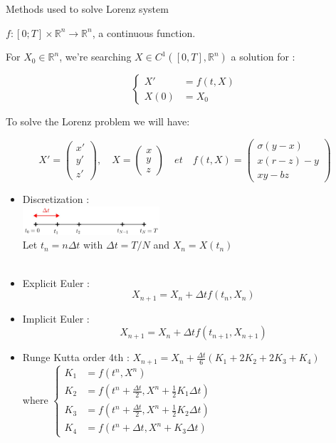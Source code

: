 \documentclass[10pt,xcolor={table,dvipsnames},t]{beamer}
\begin{document}
	\begin{frame}[allowframebreaks]{Methods used to solve Lorenz system}
		
		$f : [0; T] \times \mathbb{R}^n \rightarrow \mathbb{R}^n$, \; a continuous function.
		
		For $X_0\in \mathbb{R}^n$, we're searching $X\in C^1([0,T],\mathbb{R}^n)$ a solution for :
		
		$$\left\{\begin{aligned}
			X'&=f(t,X) \\
			X(0)&=X_0
		\end{aligned}\right.$$
		
		To solve the Lorenz problem we will have:
		
		$$X'=\begin{pmatrix}
			x' \\
			y' \\
			z'
		\end{pmatrix}, \quad X=\begin{pmatrix}
			x \\
			y \\
			z
		\end{pmatrix} \quad et \quad f(t,X)=\begin{pmatrix}
			\sigma(y-x) \\
			x(r-z)-y \\
			xy-bz
		\end{pmatrix}$$
		
		\newpage
		
		\begin{itemize}
			\item Discretization : \\
			\quad \includegraphics[width=0.4\textwidth]{images/discretization.jpg} \\ 
			Let \quad $t_n=n\Delta t$ \quad with \quad $\Delta t=T/N$ \quad and \quad $X_n=X(t_n)$ \\ \; \\
			\item Explicit Euler :
			$$X_{n+1}=X_n+\Delta t f(t_n,X_n)$$
			\item Implicit Euler :
			$$X_{n+1}=X_n+\Delta t f(t_{n+1},X_{n+1})$$
			
			\newpage
			
			\item Runge Kutta order 4th : \qquad
			$X_{n+1}=X_n+\frac{\Delta t}{6}\left(K_1+2K_2+2K_3+K_4\right)$ \\
			where \qquad $\left\{\begin{aligned}
				K_1&=f(t^n,X^n) \\
				K_2&=f\left(t^n+\frac{\Delta t}{2},X^n+\frac{1}{2} K_1\Delta t\right) \\
				K_3&=f\left(t^n+\frac{\Delta t}{2},X^n+\frac{1}{2} K_2\Delta t\right) \\
				K_4&=f\left(t^n+\Delta t,X^n+K_3\Delta t\right)
			\end{aligned}\right.$ \\ \; \\ \; \\
			

\end{itemize}
\end{frame}
\end{document}
